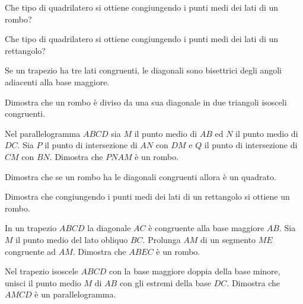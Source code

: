 \begin{multicols}{2}
\begin{esercizio}
	\label{ese:4.50}
	Che tipo di quadrilatero si ottiene congiungendo i punti medi dei 
	lati di un rombo?
\end{esercizio}

\begin{esercizio}
	\label{ese:4.51}
	Che tipo di quadrilatero si ottiene congiungendo i punti medi dei 
	lati di un rettangolo?
\end{esercizio}

\begin{esercizio}
\label{ese:4.8}
Se un trapezio ha tre lati congruenti, le diagonali sono bisettrici 
degli angoli adiacenti alla base maggiore.
\end{esercizio}

\begin{esercizio}
\label{ese:4.9}
Dimostra che un rombo è diviso da una sua diagonale in due triangoli 
isosceli congruenti.
\end{esercizio}

\begin{esercizio}
\label{ese:4.21}
Nel parallelogramma $ABCD$ sia $M$ il punto medio di $AB$ ed $N$ il 
punto medio di $DC$. Sia $P$ il punto di intersezione di $AN$ con 
$DM$ e $Q$ il punto di intersezione di $CM$ con $BN$. Dimostra che 
$PNAM$ è un rombo.
\end{esercizio}

\begin{esercizio}
\label{ese:4.22}
Dimostra che se un rombo ha le diagonali congruenti allora è un 
quadrato.
\end{esercizio}

\begin{esercizio}
\label{ese:4.23}
Dimostra che congiungendo i punti medi dei lati di un rettangolo si 
ottiene un rombo.
\end{esercizio}

\begin{esercizio}
\label{ese:4.27}
In un trapezio $ABCD$ la diagonale $AC$ è congruente alla base 
maggiore $AB$. Sia $M$ il punto medio del lato obliquo $BC$. Prolunga 
$AM$ di un segmento $ME$ congruente ad $AM$. Dimostra che $ABEC$ è un 
rombo.
\end{esercizio}

\begin{esercizio}
\label{ese:4.28}
Nel trapezio isoscele $ABCD$ con la base maggiore doppia della base 
minore, unisci il punto medio $M$ di $AB$ con gli estremi della base 
$DC$. Dimostra che $AMCD$ è un parallelogramma.
\end{esercizio}


\end{multicols}
